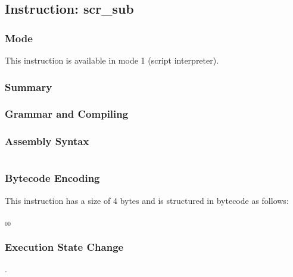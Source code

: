 \subsection{Instruction: scr\_sub}

\subsubsection{Mode}
This instruction is available in mode 1 (script interpreter).
\subsubsection{Summary}


\subsubsection{Grammar and Compiling}


\subsubsection{Assembly Syntax}

\begin{myquote}
\begin{verbatim}

\end{verbatim}
\end{myquote}

\subsubsection{Bytecode Encoding}

This instruction has a size of 4 bytes and is structured in bytecode as follows:

$_{00}$\ 


\subsubsection{Execution State Change}

.


